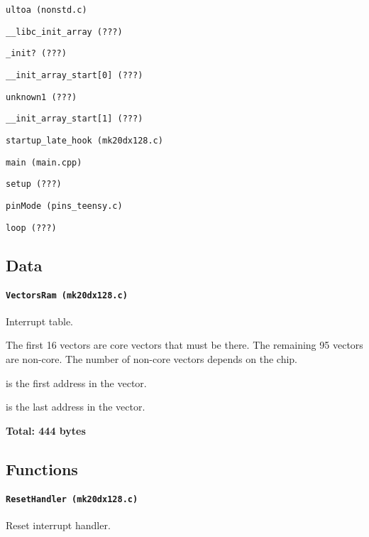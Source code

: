 \hspace{8mm} \texttt{ultoa (nonstd.c)}

\hspace{2mm} \texttt{\_\_libc\_init\_array (???)}

\hspace{4mm} \texttt{\_init? (???)}

\hspace{4mm} \texttt{\_\_init\_array\_start[0] (???)}

\hspace{6mm} \texttt{unknown1 (???)}

\hspace{4mm} \texttt{\_\_init\_array\_start[1] (???)}

\hspace{2mm} \texttt{startup\_late\_hook (mk20dx128.c)}

\hspace{2mm} \texttt{main (main.cpp)}

\hspace{4mm} \texttt{setup (???)}

\hspace{6mm} \texttt{pinMode (pins\_teensy.c)}

\hspace{4mm} \texttt{loop (???)}

\subsection{Data}

\paragraph{\texttt{VectorsRam (mk20dx128.c)}} Interrupt table.

The first 16 vectors are core vectors that must be there. The remaining 95
vectors are non-core. The number of non-core vectors depends on the chip.

 is the first address in the vector.

 is the last address in the vector.

\textbf{Total: 444 bytes}

\subsection{Functions}

\paragraph{\texttt{ResetHandler (mk20dx128.c)}} Reset interrupt handler.

